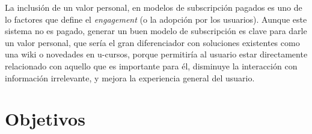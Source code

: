 \documentclass[guia]{upropuesta}
\begin{document}
     \par La inclusión de un valor personal, en modelos de subscripción pagados es uno de lo factores que define el \textit{engagement}\cite{Hansen2018} (o la adopción por los usuarios). Aunque este sistema no es pagado, generar un buen modelo de subscripción es clave para darle un valor personal, que sería el gran diferenciador con soluciones existentes como una wiki o novedades en u-cursos, porque permitiría al usuario estar directamente relacionado con aquello que es importante para él, disminuye la interacción con información irrelevante, y mejora la experiencia general del usuario.
     
    
    
 
    

    

    


\newpage
\section{Objetivos}\label{chap:obj}


\end{document}
